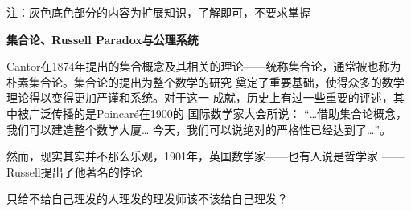 \bs
\centerline{注：灰色底色部分的内容为扩展知识，了解即可，不要求掌握}
\begin{shaded}
	{\bf 集合论、Russell Paradox与公理系统}

	Cantor在1874年提出的集合概念及其相关的理论——统称{\kaishu 集合论}，通常被也称为{\kaishu 朴素集合论}。集合论的提出为整个数学的研究
	奠定了重要基础，使得众多的数学理论得以变得更加严谨和系统。对于这一
	成就，历史上有过一些重要的评述，其中被广泛传播的是Poincaré在1900的
	国际数学家大会所说：{\kaishu
	 “\ldots 借助集合论概念，
	 我们可以建造整个数学大厦\ldots  
	 今天，我们可以说绝对的严格性已经达到了\ldots”}。
	
	然而，现实其实并不那么乐观，1901年，英国数学家——也有人说是哲学家
	——Russell提出了他著名的悖论


	\centerline{\kaishu 只给不给自己理发的人理发的理发师该不该给自己理发？}
	

\end{shaded}
